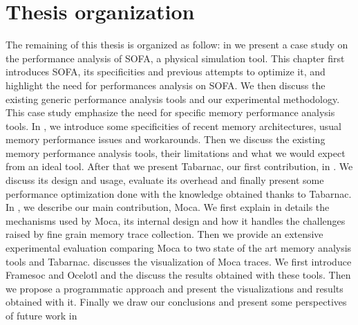 \section{Thesis organization}

The remaining of this thesis is organized as follow:
in  we present a case study on the performance analysis of \gls{SOFA}, a physical simulation tool.
This chapter first introduces \gls{SOFA}, its specificities and previous attempts to optimize it, and highlight the need for performances analysis on \gls{SOFA}.
We then discuss the existing generic performance analysis tools and our experimental methodology.
This case study emphasize the need for specific memory performance analysis tools.
In , we introduce some specificities of recent memory architectures, usual memory performance issues and workarounds.
Then we discuss the existing memory performance analysis tools, their limitations and what we would expect from an ideal tool.
After that we present \gls{Tabarnac}, our first contribution, in .
We discuss its design and usage, evaluate its overhead and finally present some performance optimization done with the knowledge obtained thanks to \gls{Tabarnac}.
In , we describe our main contribution, \gls{Moca}.
We first explain in details the mechanisms used by \gls{Moca}, its internal design and how it handles the challenges raised by fine grain memory trace collection.
Then we provide an extensive experimental evaluation comparing \gls{Moca} to two state of the art memory analysis tools and \gls{Tabarnac}.
 discusses the visualization of \gls{Moca} traces.
We first introduce \gls{Framesoc} and \gls{Ocelotl} and the discuss the results obtained with these tools.
Then we propose a programmatic approach and present the visualizations and results obtained with it.
Finally we draw our conclusions and present some perspectives of future work in 

\glsresetall
